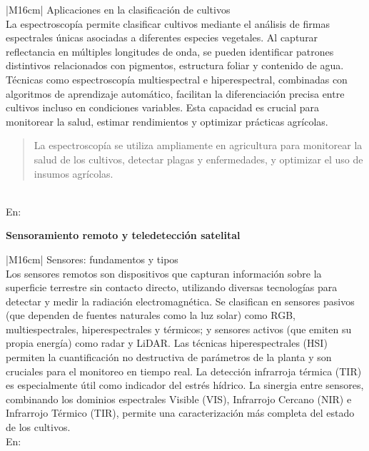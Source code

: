 \begin{table}[h!]
  \centering
  \renewcommand{\arraystretch}{2} %
  \begin{tabular}{|M{16cm}|}
    \hline
    Aplicaciones en la clasificación de cultivos \\
    \hline
    La espectroscopía permite clasificar cultivos mediante el análisis de firmas espectrales únicas asociadas a diferentes especies vegetales. Al capturar reflectancia en múltiples longitudes de onda, se pueden identificar patrones distintivos relacionados con pigmentos, estructura foliar y contenido de agua. Técnicas como espectroscopía multiespectral e hiperespectral, combinadas con algoritmos de aprendizaje automático, facilitan la diferenciación precisa entre cultivos incluso en condiciones variables. Esta capacidad es crucial para monitorear la salud, estimar rendimientos y optimizar prácticas agrícolas.
    \begin{quote}
    La espectroscopía se utiliza ampliamente en agricultura para monitorear la salud de los cultivos, detectar plagas y enfermedades, y optimizar el uso de insumos agrícolas.
    \end{quote} \\
    \hline
    En: \cite{Brown2025} \\
    \hline
  \end{tabular}
  \label{tab:argumento1c}
\end{table}
\newpage
{\large\textbf{Sensoramiento remoto y teledetección satelital}}

\begin{table}[h!]
  \centering
  \renewcommand{\arraystretch}{2} %
  \begin{tabular}{|M{16cm}|}
    \hline
    Sensores: fundamentos y tipos \\
    \hline
    Los sensores remotos son dispositivos que capturan información sobre la superficie terrestre sin contacto directo, utilizando diversas tecnologías para detectar y medir la radiación electromagnética. Se clasifican en sensores pasivos (que dependen de fuentes naturales como la luz solar) como RGB, multiespectrales, hiperespectrales y térmicos; y sensores activos (que emiten su propia energía) como radar y LiDAR. Las técnicas hiperespectrales (HSI) permiten la cuantificación no destructiva de parámetros de la planta y son cruciales para el monitoreo en tiempo real. La detección infrarroja térmica (TIR) es especialmente útil como indicador del estrés hídrico. La sinergia entre sensores, combinando los dominios espectrales Visible (VIS), Infrarrojo Cercano (NIR) e Infrarrojo Térmico (TIR), permite una caracterización más completa del estado de los cultivos.
    \\
    \hline
    En: \cite{Prasad2025} \\
    \hline
  \end{tabular}
  \label{tab:argumento2}
\end{table}

